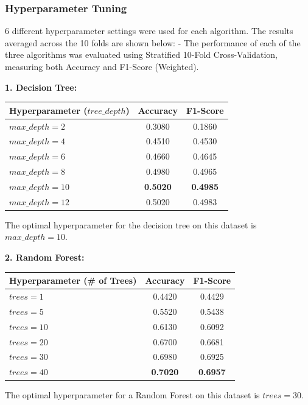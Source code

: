 \documentclass{article}
\begin{document}
\subsubsection{Hyperparameter Tuning}

6 different hyperparameter settings were used for each algorithm. The results averaged across the 10 folds are shown below:
- The performance of each of the three algorithms was evaluated using Stratified 10-Fold Cross-Validation, measuring both Accuracy and F1-Score (Weighted). 

\vspace{0.25cm}
\textbf{1. Decision Tree:}
\begin{table}[H]
\centering
\begin{tabular}{|l|c|c|}
\hline
\textbf{Hyperparameter ($tree\_depth$)} & \textbf{Accuracy} & \textbf{F1-Score} \\ \hline
$max\_depth = 2$ & 0.3080 & 0.1860 \\ \hline
$max\_depth = 4$ & 0.4510 & 0.4530 \\ \hline
$max\_depth = 6$ & 0.4660 & 0.4645 \\ \hline
$max\_depth = 8$ & 0.4980 & 0.4965 \\ \hline
$max\_depth = 10$ & \textbf{0.5020} & \textbf{0.4985} \\ \hline
$max\_depth = 12$ & 0.5020 & 0.4983 \\ \hline
\end{tabular}
\end{table}
\noindent The optimal hyperparameter for the decision tree on this dataset is $max\_depth = 10$.

\vspace{0.25cm}
\textbf{2. Random Forest:}
\begin{table}[H]
\centering
\begin{tabular}{|l|c|c|}
\hline
\textbf{Hyperparameter (\# of Trees)} & \textbf{Accuracy} & \textbf{F1-Score} \\ \hline
$trees = 1$ & 0.4420 & 0.4429 \\ \hline
$trees = 5$ & 0.5520 & 0.5438 \\ \hline
$trees = 10$ & 0.6130 & 0.6092 \\ \hline
$trees = 20$ & 0.6700 & 0.6681 \\ \hline
$trees = 30$ & 0.6980 & 0.6925 \\ \hline
$trees = 40$ & \textbf{0.7020} & \textbf{0.6957} \\ \hline
\end{tabular}
\end{table}
\noindent The optimal hyperparameter for a Random Forest on this dataset is $trees=30$.
\end{document}
